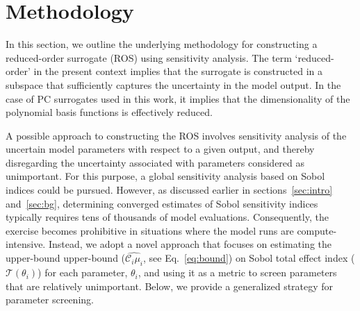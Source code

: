 \section{Methodology}
\label{sec:method}

%

In this section, we outline the underlying methodology for constructing a 
reduced-order surrogate (ROS) using sensitivity analysis. The term `reduced-order'
in the present context implies that the surrogate is constructed in a 
subspace that sufficiently captures the uncertainty in the model output. 
In the case of PC surrogates used in this work, it implies that the dimensionality
of the polynomial basis functions is effectively reduced. 

A possible approach to 
constructing the ROS involves sensitivity analysis of the
uncertain model parameters with respect to a given output, and thereby
disregarding the uncertainty associated with parameters considered as unimportant.
For this purpose, a global sensitivity analysis based on Sobol indices could be pursued.
However, as discussed earlier in sections~\ref{sec:intro} and~\ref{sec:bg}, determining converged 
estimates of Sobol sensitivity indices typically requires tens of thousands
of model evaluations. Consequently, the exercise becomes prohibitive in
situations where the model runs are compute-intensive. Instead, we adopt a novel approach
that focuses on estimating the upper-bound
upper-bound ($\widehat{\mathcal{C}_i\mu_i}$, see Eq.~\ref{eq:bound}) on Sobol total
effect index ($\mathcal{T}(\theta_i)$) for each parameter, $\theta_i$, and using it as a 
metric to screen parameters that are relatively unimportant. Below, we provide a generalized
strategy for parameter screening. 

